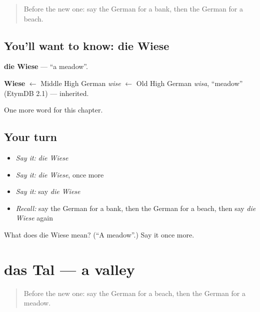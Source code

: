 \label{lesson:GE-C196-wiese}



\begin{quote}
Before the new one: say the German for a bank, then the German for a beach.
\end{quote}

\subsection*{You'll want to know: die Wiese}
\textbf{die Wiese} — \textquotedblleft{}a meadow\textquotedblright{}.

\begin{cousinweb}
\textbf{Wiese} $\leftarrow$ Middle High German \emph{wise} $\leftarrow$ Old High German \emph{wisa}, \textquotedblleft{}meadow\textquotedblright{} (EtymDB 2.1) — inherited.
\end{cousinweb}

\begin{grammarlens}[title={What you've built}]
One more word for this chapter.
\end{grammarlens}

\subsection*{Your turn}
\begin{itemize}
\raggedright
  \item \emph{Say it:} \emph{die Wiese}
  \item \emph{Say it:} \emph{die Wiese}, once more
  \item \emph{Say it:} say \emph{die Wiese}
  \item \emph{Recall:} say the German for a bank, then the German for a beach, then say \emph{die Wiese} again
\end{itemize}

\begin{tcolorbox}[breakable,colback=teal!4,colframe=teal!35!black,title={Before you move on}]
What does die Wiese mean? (\textquotedblleft{}A meadow\textquotedblright{}.) Say it once more.
\end{tcolorbox}
\section[das Tal]{das Tal — a valley}

\label{lesson:GE-C196-tal}



\begin{quote}
Before the new one: say the German for a beach, then the German for a meadow.
\end{quote}

